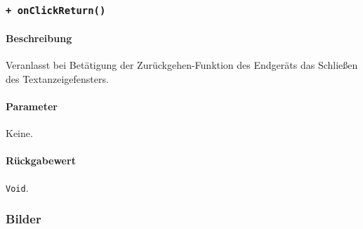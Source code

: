 \subsubsection*{\texttt{+ onClickReturn()}}\label{App_DocumentViewer_DocumentScreen_onClickReturn}%
\paragraph*{Beschreibung}
Veranlasst bei Betätigung der Zurückgehen-Funktion des Endgeräts das Schließen des Textanzeigefensters.
\paragraph*{Parameter}
Keine.
\paragraph*{Rückgabewert}
\texttt{Void}.

\subsubsection*{Bilder}\label{App_DocumentViewer_DocumentScreen_Bilder}
\begin{minipage}{\linewidth}
    \centering
    \begin{minipage}{.49\textwidth}
        \captionsetup[figure]{labelformat=empty}
        \captionsetup[figure]{labelformat=default}
    \end{minipage}
\end{minipage}
